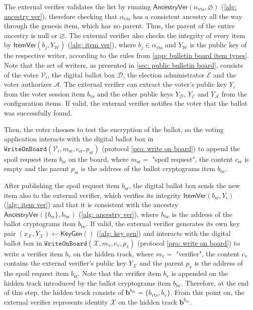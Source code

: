 The external verifier validates the list by running $\mathsf{AncestryVer}(\alpha_\mathrm{vts}, \varnothing)$ (\cref{alg: ancestry ver}), therefore checking that $\alpha_\mathrm{vts}$ has a consistent ancestry all the way through the genesis item, which has no parent. Thus, the parent of the entire ancestry is null or $\varnothing$. The external verifier also checks the integrity of every item by $\mathsf{ItemVer}(b_j, Y_\mathcal{W})$ (\cref{alg: item ver}), where $b_j \in \alpha_\mathrm{vts}$ and $Y_\mathcal{W}$ is the public key of the respective writer, according to the rules from \cref{app: bulletin board item types}. Note that the set of writers, as presented in \cref{sec: public bulletin board}, consists of the voter $\mathcal{V}_i$, the digital ballot box $\mathcal{D}$, the election administrator $\mathcal{E}$ and the voter authorizer $\mathcal{A}$. The external verifier can extract the voter's public key $Y_i$ from the voter session item $b_\mathrm{vs}$ and the other public keys $Y_\mathcal{D}$, $Y_\mathcal{E}$ and $Y_\mathcal{A}$ from the configuration items. If valid, the external verifier notifies the voter that the ballot was successfully found.

Then, the voter chooses to test the encryption of the ballot, so the voting application interacts with the digital ballot box in $\mathtt{WriteOnBoard}(\mathcal{V}_i, m_\mathrm{sr}, c_\mathrm{sr}, p_\mathrm{sr})$ (protocol \ref{pro: write on board}) to append the spoil request item $b_\mathrm{sr}$ on the board, where $m_\mathrm{sr} = $ "spoil request", the content $c_\mathrm{sr}$ is empty and the parent $p_\mathrm{sr}$ is the address of the ballot cryptograms item $b_\mathrm{bc}$.

After publishing the spoil request item $b_\mathrm{sr}$, the digital ballot box sends the new item also to the external verifier, which verifies its integrity $\mathsf{ItemVer}(b_\mathrm{sr}, Y_i)$ (\cref{alg: item ver}) and that it is consistent with the ancestry $\mathsf{AncestryVer}(\{ b_\mathrm{sr} \}, h_\mathrm{bc})$ (\cref{alg: ancestry ver}), where $h_\mathrm{bc}$ is the address of the ballot cryptograms item $b_\mathrm{bc}$. If valid, the external verifier generates its own key pair $(x_\mathcal{X}, Y_\mathcal{X}) \gets \mathsf{KeyGen}()$ (\cref{alg: key gen}) and interacts with the digital ballot box in $\mathtt{WriteOnBoard}(\mathcal{X}, m_\mathrm{v}, c_\mathrm{v}, p_\mathrm{v})$ (protocol \ref{pro: write on board}) to write a verifier item $b_\mathrm{v}$ on the hidden track, where $m_\mathrm{v} =$ "verifier", the content $c_\mathrm{v}$ contains the external verifier's public key $Y_\mathcal{X}$ and the parent $p_\mathrm{v}$ is the address of the spoil request item $b_\mathrm{sr}$. Note that the verifier item $b_\mathrm{v}$ is appended on the hidden track introduced by the ballot cryptograms item $b_\mathrm{bc}$. Therefore, at the end of this step, the hidden track consists of $\boldsymbol{b}^{b_\mathrm{bc}} = \{ b_\mathrm{vts}, b_\mathrm{v} \}$. From this point on, the external verifier represents identity $\mathcal{X}$ on the hidden track $\boldsymbol{b}^{b_\mathrm{bc}}$.

